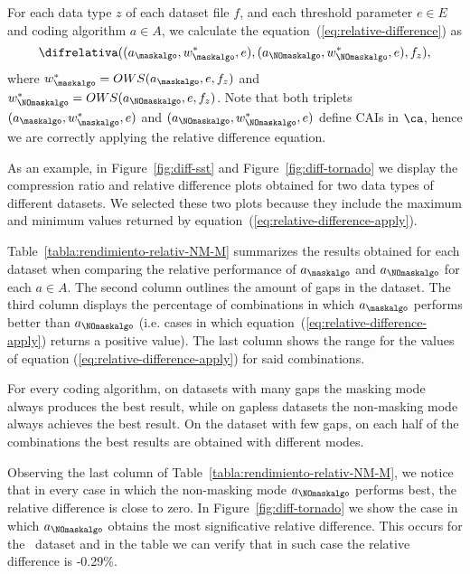 For each data type $z$ of each dataset file $f$, and each threshold parameter $e \in E$ and coding algorithm $a \in A$, we calculate the equation~(\ref{eq:relative-difference}) as
\begin{equation}
\label{eq:relative-difference-apply}
\difrelativa((a_\maskalgo, w_\maskalgo^{*}, e), (a_\NOmaskalgo, w_\NOmaskalgo^{*}, e), f_z),
\end{equation}
where $w_\maskalgo^{*}=OWS(a_\maskalgo, e, f_z)$ and $w_\NOmaskalgo^{*}=OWS(a_\NOmaskalgo, e, f_z)$. Note that both triplets $(a_\maskalgo, w_\maskalgo^{*}, e)$ and $(a_\NOmaskalgo, w_\NOmaskalgo^{*}, e)$ define CAIs in $\ca$, hence we are correctly applying the relative difference equation.


As an example, in Figure~\ref{fig:diff-sst} and Figure~\ref{fig:diff-tornado} we display the compression ratio and relative difference plots obtained for two data types of different datasets. We selected these two plots because they include the maximum and minimum values returned by equation~(\ref{eq:relative-difference-apply}).


Table~\ref{tabla:rendimiento-relativ-NM-M} summarizes the results obtained for each dataset when comparing the relative performance of $a_\maskalgo$ and $a_\NOmaskalgo$ for each $a \in A$. The second column outlines the amount of gaps in the dataset. The third column displays the percentage of combinations in which $a_\maskalgo$ performs better than $a_\NOmaskalgo$ (i.e. cases in which equation~(\ref{eq:relative-difference-apply}) returns a positive value). The last column shows the range for the values of equation (\ref{eq:relative-difference-apply}) for said combinations.


\vspace{+5pt}

\vspace{-5pt}


For every coding algorithm, on datasets with many gaps the masking mode always produces the best result, while on gapless datasets the non-masking mode always achieves the best result. On the dataset with few gaps, on each half of the combinations the best results are obtained with different modes.


Observing the last column of Table~\ref{tabla:rendimiento-relativ-NM-M}, we notice that in every case in which the non-masking mode $a_\NOmaskalgo$ performs best, the relative difference is close to zero. In Figure~\ref{fig:diff-tornado} we show the case in which $a_\NOmaskalgo$ obtains the most significative relative difference. This occurs for the \datasettornado \ dataset and in the table we can verify that in such case the relative difference is -0.29\%.


